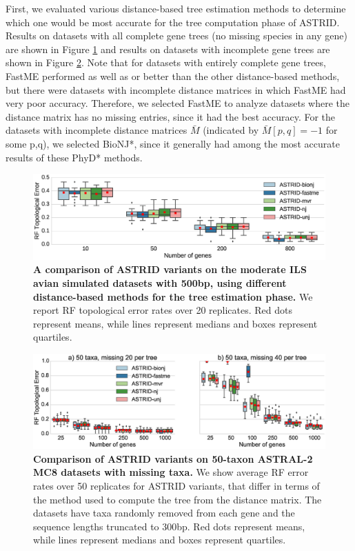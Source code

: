 First, we evaluated various distance-based tree estimation methods to
determine which one would be most accurate for the tree computation
phase of ASTRID.  
Results on datasets with all complete gene trees (no missing species
in any gene) are shown in 
Figure \ref{astrid::fig:avian-njcomparison}
and results on datasets with incomplete gene trees
are shown in Figure \ref{astrid::fig:astral2-missing-njcomparison-main-l300}.
Note that
for datasets with entirely complete gene trees, 
FastME performed as well as or better than the other
distance-based methods, but
there were datasets with incomplete distance matrices
in which FastME had very poor accuracy. 
Therefore, 
we selected FastME to analyze datasets where the
distance matrix has no missing entries, since it had the
best accuracy. For the datasets with incomplete distance matrices
$\bar M$ (indicated by $\bar M[p,q]=-1$ for some p,q), we
selected
BioNJ*, since it generally had among the most
accurate results of these PhyD* methods.
\begin{figure}
  \centering
  \includegraphics[width=12cm]{astrid-figs/avian-njcomparison.eps}
  \caption[Comparison of  ASTRID variants on
moderate ILS avian simulated datasets]{\textbf{A comparison of ASTRID variants on the
moderate ILS avian simulated datasets with 500bp, using 
different distance-based methods for the
      tree estimation phase.}
    We report RF topological error rates over 20 replicates. Red dots
    represent means, while lines represent medians and boxes represent
    quartiles. 
}
  \label{astrid::fig:avian-njcomparison}
\end{figure}


\begin{figure}
  \centering
  \includegraphics[width=12cm]{astrid-figs/astral2-missing-l300-njcomparison-main.eps}
  \caption[Comparison of ASTRID variants
on 50-taxon datasets with missing taxa.]{\textbf{Comparison of ASTRID variants
on 50-taxon ASTRAL-2 MC8 datasets with missing taxa.}
 We show
average RF error rates over 50 replicates for
ASTRID variants, that differ in terms of the method used
to compute the tree from the distance matrix. 
The datasets have  taxa randomly removed
    from each gene and the sequence lengths truncated to 300bp. 
    Red dots
    represent means, while lines represent medians and boxes represent
    quartiles.}
  \label{astrid::fig:astral2-missing-njcomparison-main-l300}
\end{figure}


